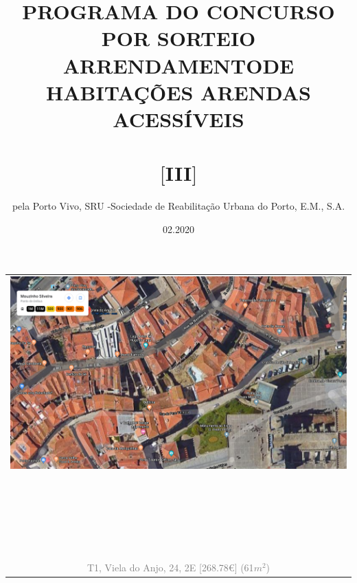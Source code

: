 \documentclass[]{report}
\title{PROGRAMA DO CONCURSO POR SORTEIO \\ ARRENDAMENTODE HABITAÇÕES ARENDAS ACESSÍVEIS \\ ~\\ $[$III$]$ \\}
\author{pela Porto Vivo, SRU -Sociedade de Reabilitação Urbana do Porto, E.M., S.A.}
\date{02.2020}
\begin{document}
\maketitle






\begin{table}[]
	\begin{center}
		\begin{huge}
			\begin{tabular}{c}
				\includegraphics[width=1\textwidth]{viela_do_anjo_24} \\
				~\\
				~\\
				~\\
				~\\
				~\\
				\textcolor{gray}{T1, Viela do Anjo, 24, 2E [268.78€] (61$m^{2}$)}
			\end{tabular}
		\end{huge}
	\end{center}
\end{table}
\end{document}
